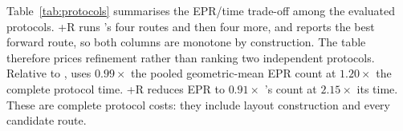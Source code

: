 Table~\ref{tab:protocols} summarises the EPR/time trade-off among the
evaluated protocols. \PORTER{}+R runs \PORTER{}'s four routes and then four
more, and reports the best forward route, so both columns are monotone by
construction. The table therefore prices refinement rather than
ranking two independent protocols. Relative to
\dSABRE{}, \PORTER{} uses $0.99\times$ the pooled geometric-mean EPR count
at $1.20\times$ the complete protocol time. \PORTER{}+R reduces EPR to
$0.91\times$ \dSABRE{}'s count at $2.15\times$ its time. These are complete
protocol costs: they include layout construction and every candidate route.
